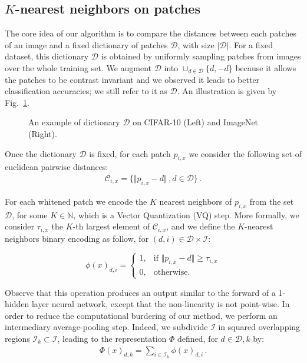 \documentclass{article}
\begin{document}
{\subsection{$K$-nearest neighbors on patches}

The core idea of our algorithm is to compare the distances between each patches of an image and a fixed dictionary of patches $\mathcal{D}$, with size $|\mathcal{D}|$.
For a fixed dataset, this dictionary $\mathcal{D}$ is obtained by uniformly sampling patches from images over the whole training set. We augment $\mathcal{D}$ into $\cup_{d\in \mathcal{D}}\{d,-d\}$ because it allows the patches to be contrast invariant and we observed it leads to better classification accuracies; we still refer to it as $\mathcal{D}$. An illustration is given by Fig.~\ref{dico}.

\begin{figure}
  \centering
  \fbox{\rule[-.5cm]{0cm}{4cm} \rule[-.5cm]{4cm}{0cm}}
  \caption{An example of dictionary $\mathcal{D}$ on CIFAR-10 (Left) and ImageNet (Right).\label{dico}}
\end{figure}

Once the dictionary $\mathcal{D}$ is fixed, for each patch $p_{i,x}$ we consider the following set of euclidean pairwise distances:
\begin{align*}\mathcal{C}_{i, x} =\{\Vert p_{i, x} - d \Vert\,, d\in\mathcal{D} \}\,.\end{align*}
 
For each whitened patch we encode the $K$ nearest neighbors of $p_{i,x}$ from the set $\mathcal{D}$, for some $ K \in \mathbb{N}$, which is a Vector Quantization (VQ) step.
More formally, we consider $\tau_{i,x}$ the $K$-th largest element of $\mathcal{C}_{i,x}$, and we define the $K$-nearest neighbors binary encoding as follow, for $(d,i)\in\mathcal{D}\times\mathcal{I}$:


\begin{equation}
\phi(x)_{d,i}=
\begin{cases}
1,&\text{if } \Vert  p_{i,x} - d\Vert \geq \tau_{i,x}\\
0,&\text{otherwise}.
\end{cases}
\end{equation}






Observe that this operation produces an output similar to the forward of a 1-hidden layer neural network, except that the non-linearity is not point-wise. In order to reduce the computational burdering of our method, we perform an intermediary average-pooling step.
Indeed, we subdivide $\mathcal{I}$ in squared overlapping regions $\mathcal{I}_k\subset\mathcal{I}$, leading to the representation $\Phi$ defined, for $d\in\mathcal{D}, k$ by:
\begin{align*}\Phi(x)_{d,k}= \sum_{i\in \mathcal{I}_k}\phi(x)_{d,i}\,.\end{align*}

}
\end{document}

